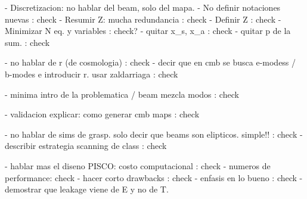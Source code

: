 
 - Discretizacion: no hablar del beam, solo del mapa.
 - No definir notaciones nuevas : check
 - Resumir Z: mucha redundancia : check
 - Definir Z : check
 - Minimizar N eq. y variables : check?
 - quitar x_s, x_a : check
 - quitar p de la sum. : check
 
 - no hablar de r (de cosmologia) : check
 - decir que en cmb se busca e-modess / b-modes e introducir r. usar zaldarriaga : check

 - minima intro de la problematica / beam mezcla modos : check

 - validacion explicar: como generar cmb maps : check

 - no hablar de sims de grasp. solo decir que beams son elipticos. simple!! : check
 - describir estrategia scanning de class : check

 - hablar mas el diseno PISCO: costo computacional : check
 - numeros de performance: check
 - hacer corto drawbacks : check
 - enfasis en lo bueno : check
 - demostrar que leakage viene de E y no de T.
 